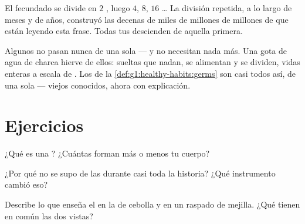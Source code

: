 \begin{example}\label{ex:g5:first-look-at-cells:one}
El  fecundado se divide en $2$ , luego $4$, $8$, $16$
\dots{} La división repetida, a lo largo de meses y de años,
construyó las decenas de miles de millones de millones de  que
están leyendo esta frase. Todas tus  descienden de aquella
primera.
\end{example}

\begin{remark}\label{rem:g5:first-look-at-cells:onecelled}
Algunos  no pasan nunca de una sola  --- y no
necesitan nada más. Una gota de agua de charca hierve de ellos:
 sueltas que nadan, se alimentan y se dividen, vidas enteras a
escala de . Los  de la
\cref{def:g1:healthy-habits:germs} son casi todos  así, de
una sola  --- viejos conocidos, ahora con explicación.
\end{remark}

\section{Ejercicios}

\begin{exercise}[$\star$]\label{exo:g5:first-look-at-cells:1}
¿Qué es una ? ¿Cuántas forman más o menos tu cuerpo?
\end{exercise}

\begin{exercise}[$\star$]\label{exo:g5:first-look-at-cells:2}
¿Por qué no se supo de las  durante casi toda la historia? ¿Qué
instrumento cambió eso?
\end{exercise}

\begin{exercise}[$\star$]\label{exo:g5:first-look-at-cells:3}
Describe lo que enseña el  en la  de cebolla y en un
raspado de mejilla. ¿Qué tienen en común las dos vistas?
\end{exercise}

